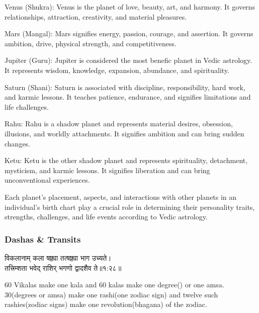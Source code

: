 Venus (Shukra): Venus is the planet of love, beauty, art, and harmony. It governs relationships, attraction, creativity, and material pleasures.

Mars (Mangal): Mars signifies energy, passion, courage, and assertion. It governs ambition, drive, physical strength, and competitiveness.

Jupiter (Guru): Jupiter is considered the most benefic planet in Vedic astrology. It represents wisdom, knowledge, expansion, abundance, and spirituality.

Saturn (Shani): Saturn is associated with discipline, responsibility, hard work, and karmic lessons. It teaches patience, endurance, and signifies limitations and life challenges.

Rahu: Rahu is a shadow planet and represents material desires, obsession, illusions, and worldly attachments. It signifies ambition and can bring sudden changes.

Ketu: Ketu is the other shadow planet and represents spirituality, detachment, mysticism, and karmic lessons. It signifies liberation and can bring unconventional experiences.

Each planet's placement, aspects, and interactions with other planets in an individual's birth chart play a crucial role in determining their personality traits, strengths, challenges, and life events according to Vedic astrology.

\subsubsection{Dashas \& Transits}
\begin{sanskrit}
	\begin{center}
		विकलानाम् कला षष्ट्या तत्षष्ट्या भाग उच्यते।\\तत्त्रिम्शता भवेद् राशिर् भगणो द्वादशैव ते॥१:२८॥\cite{SuryaSiddhanta, wiki:ss}
	\end{center}
\end{sanskrit}
60 Vikalas make one kala and 60 kalas make one degree(\textdegree) or one amsa. 30\textdegree(degrees or amsa) make one rashi(one zodiac sign) and twelve such rashies(zodiac signs) make one revolution(bhagana) of the zodiac.

